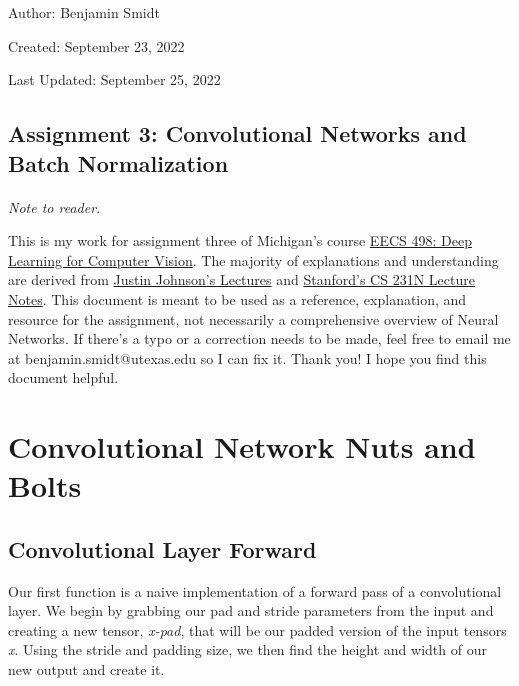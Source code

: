 \documentclass[12pt]{article}
\begin{document}
\noindent Author: Benjamin Smidt

\noindent Created: September 23, 2022

\noindent Last Updated: September 25, 2022
\begin{center}
\section*{Assignment 3: Convolutional Networks and Batch Normalization}
\end{center}

\paragraph{} \emph{Note to reader.} 

This is my work for assignment three of Michigan's course
\href{https://web.eecs.umich.edu/~justincj/teaching/eecs498/WI2022/}
{EECS 498: Deep Learning for Computer Vision}. The majority of explanations and understanding are 
derived from \href{https://www.youtube.com/watch?v=dJYGatp4SvA&list=PL5-TkQAfAZFbzxjBHtzdVCWE0Zbhomg7r&index=1}
{Justin Johnson's Lectures} and \href{http://cs231n.stanford.edu/schedule.html}{Stanford's CS 231N Lecture Notes}.
This document is meant to be used as a reference, 
explanation, and resource for the assignment, not necessarily a comprehensive overview
of Neural Networks. If there's a typo or a correction needs to be made, feel free to 
email me at benjamin.smidt@utexas.edu so I can fix it. Thank you! I hope you find this 
document helpful.

\tableofcontents{}

\newpage

\section{Convolutional Network Nuts and Bolts}

\subsection{Convolutional Layer Forward}
Our first function is a naive implementation of a forward pass of a convolutional 
layer. We begin by grabbing our pad and stride parameters from the input and creating a 
new tensor, \emph{x-pad}, that will be our padded version of the input tensors \emph{x}. 
Using the stride and padding size, we then find the height and width of our new output 
and create it. 
\end{document}
